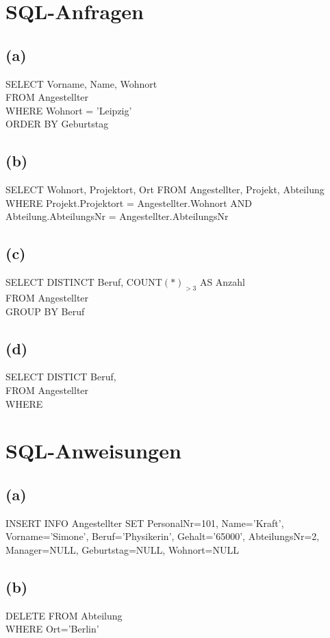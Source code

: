 \documentclass{article}
\begin{document}
\section{SQL-Anfragen}
\subsection{(a)}
SELECT Vorname, Name, Wohnort\\
FROM Angestellter\\
WHERE Wohnort = 'Leipzig'\\
ORDER BY Geburtstag\\

\subsection{(b)}
SELECT Wohnort, Projektort, Ort
FROM Angestellter, Projekt, Abteilung\\
WHERE Projekt.Projektort = Angestellter.Wohnort
AND Abteilung.AbteilungsNr = Angestellter.AbteilungsNr \\
 
 
\subsection{(c)}
SELECT DISTINCT Beruf, COUNT$(*)_{>3}$ AS Anzahl\\
FROM Angestellter\\
GROUP BY Beruf\\


\subsection{(d)}
SELECT DISTICT Beruf, \\
FROM Angestellter \\
WHERE 




\section{SQL-Anweisungen}
\subsection{(a)}
INSERT INFO Angestellter 
SET PersonalNr=101, Name='Kraft', Vorname='Simone', Beruf='Physikerin', Gehalt='65000', AbteilungsNr=2,
Manager=NULL, Geburtstag=NULL, Wohnort=NULL

\subsection{(b)}
DELETE FROM Abteilung\\
WHERE Ort='Berlin'


    
\end{document}
